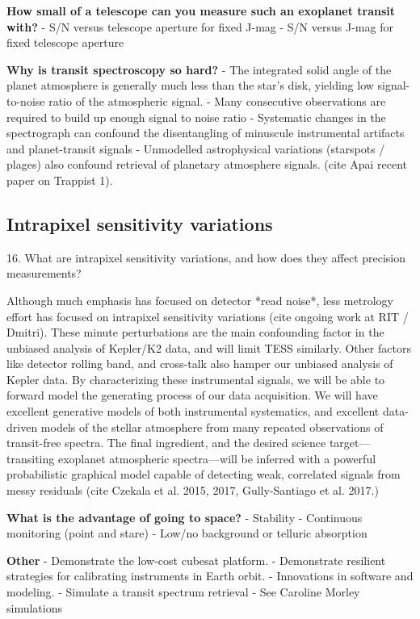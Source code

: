 \documentclass[12pt]{article}
\begin{document}
\textbf{How small of a telescope can you measure such an exoplanet transit with?}
- S/N versus telescope aperture for fixed J-mag
- S/N versus J-mag for fixed telescope aperture

\textbf{Why is transit spectroscopy so hard?}
- The integrated solid angle of the planet atmosphere is generally much less than the star's disk, yielding low signal-to-noise ratio of the atmospheric signal.
- Many consecutive observations are required to build up enough signal to noise ratio
- Systematic changes in the spectrograph can confound the disentangling of minuscule instrumental artifacts and planet-transit signals
- Unmodelled astrophysical variations (starspots / plages) also confound retrieval of planetary atmosphere signals. (cite Apai recent paper on Trappist 1).

\subsection{Intrapixel sensitivity variations}
16. What are intrapixel sensitivity variations, and how does they affect precision measurements?

Although much emphasis has focused on detector *read noise*, less metrology effort has focused on intrapixel sensitivity variations (cite ongoing work at RIT / Dmitri).  These minute perturbations are the main confounding factor in the unbiased analysis of Kepler/K2 data, and will limit TESS similarly.  Other factors like detector rolling band, and cross-talk also hamper our unbiased analysis of Kepler data.  By characterizing these instrumental signals, we will be able to forward model the generating process of our data acquisition.  We will have excellent generative models of both instrumental systematics, and excellent data-driven models of the stellar atmosphere from many repeated observations of transit-free spectra.  The final ingredient, and the desired science target---transiting exoplanet atmospheric spectra---will be inferred with a powerful probabilistic graphical model capable of detecting weak, correlated signals from messy residuals (cite Czekala et al. 2015, 2017, Gully-Santiago et al. 2017.)

\textbf{What is the advantage of going to space?}
- Stability
- Continuous monitoring (point and stare)
- Low/no background or telluric absorption

\textbf{Other}
- Demonstrate the low-cost cubesat platform.
- Demonstrate resilient strategies for calibrating instruments in Earth orbit.
- Innovations in software and modeling.
- Simulate a transit spectrum retrieval
- See Caroline Morley simulations
\end{document}
